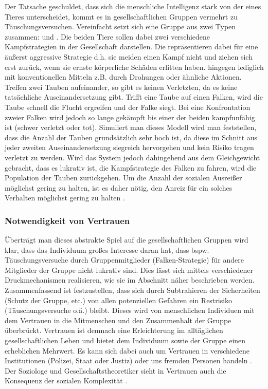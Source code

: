 Der Tatsache geschuldet, dass sich die menschliche Intelligenz stark von der eines Tieres unterscheidet, kommt es in gesellschaftlichen Gruppen vermehrt zu Täuschungsversuchen.
Vereinfacht setzt sich eine Gruppe aus zwei Typen zusammen:  und .
Die beiden Tiere sollen dabei zwei verschiedene Kampfstrategien in der Gesellschaft darstellen.
Die  repräsentieren dabei für eine äußerst aggressive Strategie d.h. sie meiden einen Kampf nicht und ziehen sich erst zurück, wenn sie ernste körperliche Schäden erlitten haben.
 hingegen  lediglich mit konventionellen Mitteln z.B. durch Drohungen oder ähnliche Aktionen.
Treffen zwei Tauben aufeinander, so gibt es keinen Verletzten, da es keine tatsächliche Auseinandersetzung gibt.
Trifft eine Taube auf einen Falken, wird die Taube schnell die Flucht ergreifen und der Falke siegt.
Bei eine Konfrontation zweier Falken wird jedoch so lange gekämpft bis einer der beiden kampfunfähig ist (schwer verletzt oder tot).
Simuliert man dieses Modell wird man feststellen, dass die Anzahl der Tauben grundsätzlich sehr hoch ist, da diese im Schnitt aus jeder zweiten Auseinandersetzung siegreich hervorgehen und kein Risiko tragen verletzt zu werden.
Wird das System jedoch dahingehend aus dem Gleichgewicht gebracht, dass es lukrativ ist, die Kampfstrategie des Falken zu fahren, wird die Population der Tauben zurückgehen.
Um die Anzahl der sozialen Ausreißer möglichst gering zu halten, ist es daher nötig, den Anreiz für ein solches Verhalten möglichst gering zu halten \citep{tauben-falken}.

\subsubsection{Notwendigkeit von Vertrauen}\label{sec:notwendigkeit-von-vertauen}
Überträgt man dieses abstrakte Spiel auf die gesellschaftlichen Gruppen wird klar, dass das Individuum großes Interesse daran hat, dass bspw. Täuschungsversuche durch Gruppenmitglieder (Falken-Strategie) für andere Mitglieder der Gruppe nicht lukrativ sind.
Dies lässt sich mittels verschiedener Druckmechanismen realisieren, wie sie im Abschnitt  näher beschrieben werden.
Zusammenfassend ist festzustellen, dass sich durch Subtrahieren der Sicherheiten (Schutz der Gruppe, etc.) von allen potenziellen Gefahren ein Restrisiko (Täuschungsversuche o.ä.) bleibt.
Dieses wird von menschlichen Individuen mit dem Vertrauen in die Mitmenschen und den Zusammenhalt der Gruppe überbrückt.
Vertrauen ist demnach eine Erleichterung im alltäglichen gesellschaftlichen Leben und bietet dem Individuum sowie der Gruppe einen erheblichen Mehrwert.
Es kann sich dabei auch um Vertrauen in verschiedene Institutionen (Polizei, Staat oder Justiz) oder uns fremden Personen handeln \citep{liars-and-outliers}.
Der Soziologe und Gesellschaftstheoretiker  sieht in Vertrauen auch die Konsequenz der sozialen Komplexität \citep{luhmann2000vertrauen}.

